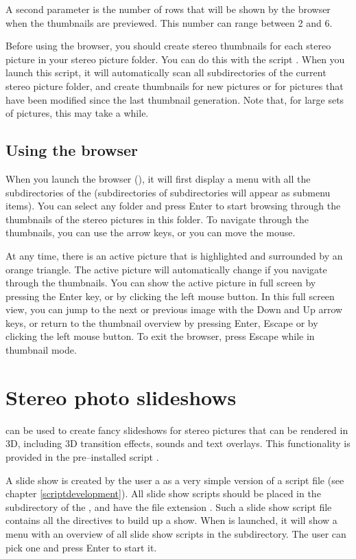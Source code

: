 A second parameter is the number of rows that will be shown by the browser when the thumbnails are previewed. This number can range between 2 and 6.

Before using the browser, you should create stereo thumbnails for each stereo picture in your stereo picture folder. You can do this with the script . When you launch this script, it will automatically scan all subdirectories of the current stereo picture folder, and create thumbnails for new pictures or for pictures that have been modified since the last thumbnail generation. Note that, for large sets of pictures, this may take a while.

\subsection{Using the browser}

When you launch the browser (), it will first display a menu with all the subdirectories of the  (subdirectories of subdirectories will appear as submenu items). You can select any folder and press Enter to start browsing through the thumbnails of the stereo pictures in this folder. To navigate through the thumbnails, you can use the arrow keys, or you can move the mouse.

At any time, there is an active picture that is highlighted and surrounded by an orange triangle. The active picture will automatically change if you navigate through the thumbnails. You can show the active picture in full screen by pressing the Enter key, or by clicking the left mouse button. In this full screen view, you can jump to the next or previous image with the Down and Up arrow keys, or return to the thumbnail overview by pressing Enter, Escape or by clicking the left mouse button. To exit the browser, press Escape while in thumbnail mode.

\section{Stereo photo slideshows}
\softwarename can be used to create fancy slideshows for stereo pictures that can be rendered in 3D, including 3D transition effects, sounds and text overlays. This functionality is provided in the pre--installed script .

A slide show is created by the user a as a very simple version of a \scriptlang script file (see chapter \ref{scriptdevelopment}). All slide show scripts should be placed in the subdirectory  of the \datadir, and have the file extension . Such a slide show script file contains all the directives to build up a show. When  is launched, it will show a menu with an overview of all slide show scripts in the  subdirectory. The user can pick one and press Enter to start it.


